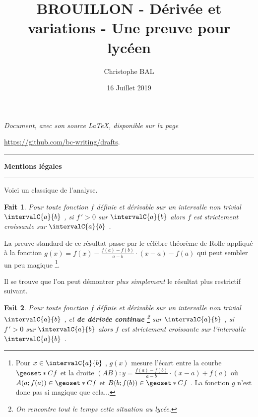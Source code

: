 \documentclass[12pt]{amsart}
\newtheorem{fact}{Fait}
\begin{document}
\title{BROUILLON - Dérivée et variations - Une preuve pour lycéen}
\author{Christophe BAL}
\date{16 Juillet 2019}

\maketitle

\begin{center}
	\itshape
	Document, avec son source \LaTeX, disponible sur la page
	
	\url{https://github.com/bc-writing/drafts}.
\end{center}


\bigskip


\begin{center}
	\hrule\vspace{.3em}
	{
		\fontsize{1.35em}{1em}\selectfont
		\textbf{Mentions \og légales \fg}
	}
			
	\vspace{0.45em}
	\doclicenseThis
	\hrule
\end{center}


\vspace{1em}


Voici un classique de l'analyse.


\begin{fact}
	Pour toute fonction $f$ définie et dérivable sur un intervalle non trivial $\intervalC{a}{b}$ , si $f\,' > 0$ sur $\intervalC{a}{b}$ alors $f$ est strictement croissante sur $\intervalC{a}{b}$ .
\end{fact}

La preuve standard de ce résultat passe par le célèbre théorème de Rolle appliqué à la fonction $g(x) = f(x) - \frac{f(a) - f(b)}{a - b} \cdot (x - a) - f(a)$ qui peut sembler un peu magique
\footnote{
	Pour $x \in \intervalC{a}{b}$ , $g(x)$ mesure l'écart entre la courbe $\geoset*{C}{f}$ et la droite $(AB) : y = \frac{f(a) - f(b)}{a - b} \cdot (x - a) + f(a)$ où $A(a ; f(a)) \in \geoset*{C}{f}$ et $B(b ; f(b)) \in \geoset*{C}{f}$ .
	La fonction $g$ n'est donc pas si magique que cela...
}.


\bigskip


Il se trouve que l'on peut démontrer \emph{\og plus simplement \fg} le résultat plus restrictif suivant.


\begin{fact}
	Pour toute fonction $f$ définie et dérivable sur un intervalle non trivial $\intervalC{a}{b}$ , et \textbf{de dérivée continue} 
	\footnote{
		On rencontre tout le temps cette situation au lycée.
	}
	sur $\intervalC{a}{b}$ , si $f\,' > 0$ sur $\intervalC{a}{b}$ alors $f$ est strictement croissante sur l'intervalle $\intervalC{a}{b}$ .
\end{fact}
\end{document}

